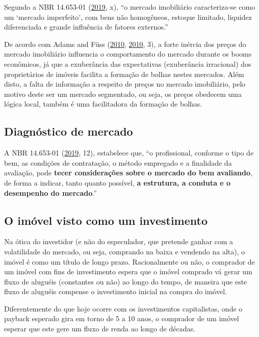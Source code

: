 \documentclass[
	12pt,				%
	oneside,			%
	a4paper,			%
	chapter=TITLE,		%
	section=TITLE,		%
	english,			%
	brazil				%
	]{abntex2}
\begin{document}
Segundo a NBR 14.653-01 (\protect\hyperlink{ref-NBR1465301}{2019}, x), ``o mercado imobiliário caracteriza-se
como um `mercado imperfeito', com bens não homogêneos, estoque limitado, liquidez
diferenciada e grande influência de fatores externos.''

De acordo com Adams and Füss (\protect\hyperlink{ref-ADAMS201038}{2010}, \protect\hyperlink{ref-ADAMS201038}{2010}, 3), a forte inércia dos preços do
mercado imobiliário influencia o comportamento do mercado durante os booms
econômicos, já que a exuberância das expectativas (exuberância irracional) dos
proprietários de imóveis facilita a formação de bolhas nestes mercados. Além
disto, a falta de informação a respeito de preços no mercado imobiliário, pelo
motivo deste ser um mercado segmentado, ou seja, os preços obedecem uma
lógica local, também é uma facilitadora da formação de bolhas.

\hypertarget{diagnuxf3stico-de-mercado}{%
\subsection{Diagnóstico de mercado}\label{diagnuxf3stico-de-mercado}}

A NBR 14.653-01 (\protect\hyperlink{ref-NBR1465301}{2019}, 12), estabelece que, ``o profissional, conforme o
tipo de bem, as condições de contratação, o método empregado e a finalidade da
avaliação, pode \textbf{tecer considerações sobre o mercado do bem avaliando}, de
forma a indicar, tanto quanto possível, \textbf{a estrutura, a conduta e o desempenho
do mercado}.''

\hypertarget{o-imuxf3vel-visto-como-um-investimento}{%
\subsection{O imóvel visto como um investimento}\label{o-imuxf3vel-visto-como-um-investimento}}

Na ótica do investidor (e não do especulador, que pretende ganhar com a
volatilidade do mercado, ou seja, comprando na baixa e vendendo na alta), o
imóvel é como um título de longo prazo. Racionalmente ou não, o comprador de um
imóvel com fins de investimento espera que o imóvel comprado vá gerar um fluxo
de aluguéis (constantes ou não) ao longo do tempo, de maneira que este fluxo de
aluguéis compense o investimento inicial na compra do imóvel.

Diferentemente do que hoje ocorre com os investimentos capitalistas, onde o
payback esperado gira em torno de 5 a 10 anos, o comprador de um imóvel
esperar que este gere um fluxo de renda ao longo de décadas.
\end{document}
